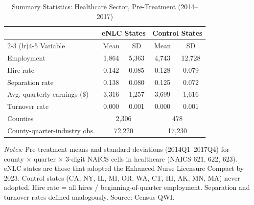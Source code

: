 
\begin{table}[H]
\centering
\caption{Summary Statistics: Healthcare Sector, Pre-Treatment (2014--2017)}
\label{tab:summary}
\begin{threeparttable}
\begin{tabular}{lcccc}
\toprule
& \multicolumn{2}{c}{eNLC States} & \multicolumn{2}{c}{Control States} \\
\cmidrule(lr){2-3} \cmidrule(lr){4-5}
Variable & Mean & SD & Mean & SD \\
\midrule
Employment & 1,864 & 5,363 & 4,743 & 12,728 \\
Hire rate & 0.142 & 0.085 & 0.128 & 0.079 \\
Separation rate & 0.138 & 0.080 & 0.125 & 0.072 \\
Avg. quarterly earnings (\$) & 3,316 & 1,257 & 3,699 & 1,616 \\
Turnover rate & 0.000 & 0.001 & 0.000 & 0.001 \\
\midrule
Counties & \multicolumn{2}{c}{2,306} & \multicolumn{2}{c}{478} \\
County-quarter-industry obs. & \multicolumn{2}{c}{72,220} & \multicolumn{2}{c}{17,230} \\
\bottomrule
\end{tabular}
\begin{tablenotes}[flushleft]
\small
\item \textit{Notes:} Pre-treatment means and standard deviations (2014Q1--2017Q4) for county $\times$ quarter $\times$ 3-digit NAICS cells in healthcare (NAICS 621, 622, 623). eNLC states are those that adopted the Enhanced Nurse Licensure Compact by 2023. Control states (CA, NY, IL, MI, OR, WA, CT, HI, AK, MN, MA) never adopted. Hire rate = all hires / beginning-of-quarter employment. Separation and turnover rates defined analogously. Source: Census QWI.
\end{tablenotes}
\end{threeparttable}
\end{table}

